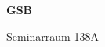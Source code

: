 \documentclass[a4paper]{article}
\begin{document}
\printGenericVSLHeader
\begin{center}
\begin{vsltext}{3cm}{4cm}

   \vspace{0.5cm} 

    \textbf{GSB} 

    \vspace{1.5cm}

    Seminarraum 138A

\end{vsltext}

\end{center}
\end{document}

